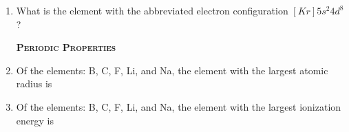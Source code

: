 \documentclass[main.tex]{subfiles}
\begin{document}
\begin{multicols*}{2}
\begin{enumerate}
\begin{enumerate}[label=(\alph*)]
\end{enumerate}

\item What is the element with the abbreviated electron configuration $[Kr]5s^2 4d^8$?
\begin{enumerate}[label=(\alph*)]
\end{enumerate}

{\raggedright\textsc{\textbf{Periodic Properties }}\par}

\item Of the elements:  B, C, F, Li, and Na, the element with the largest atomic radius is
\begin{enumerate}[label=(\alph*)]\end{enumerate}

\item Of the elements:  B, C, F, Li, and Na, the element with the largest ionization energy is
\begin{enumerate}[label=(\alph*)]


\end{enumerate}
\end{enumerate}
\end{multicols*}
\end{document}
